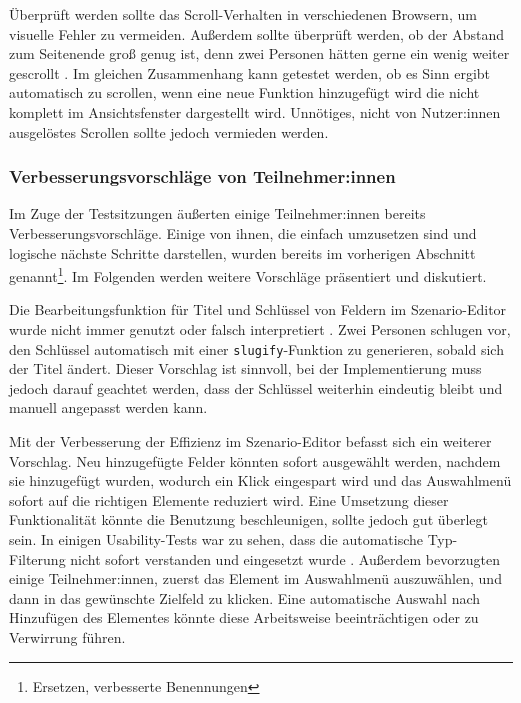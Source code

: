 Überprüft werden sollte das Scroll-Verhalten in verschiedenen Browsern, um visuelle Fehler zu vermeiden. Außerdem sollte überprüft werden, ob der Abstand zum Seitenende groß genug ist, denn zwei Personen hätten gerne ein wenig weiter gescrollt . Im gleichen Zusammenhang kann getestet werden, ob es Sinn ergibt automatisch zu scrollen, wenn eine neue Funktion hinzugefügt wird die nicht komplett im Ansichtsfenster dargestellt wird. Unnötiges, nicht von Nutzer:innen ausgelöstes Scrollen sollte jedoch vermieden werden.



\subsubsection{Verbesserungsvorschläge von Teilnehmer:innen}

Im Zuge der Testsitzungen äußerten einige Teilnehmer:innen bereits Verbesserungsvorschläge. Einige von ihnen, die einfach umzusetzen sind und logische nächste Schritte darstellen, wurden bereits im vorherigen Abschnitt genannt\footnote{Ersetzen, verbesserte Benennungen}. Im Folgenden werden weitere Vorschläge präsentiert und diskutiert.

Die Bearbeitungsfunktion für Titel und Schlüssel von Feldern im Szenario-Editor wurde nicht immer genutzt oder falsch interpretiert . Zwei Personen schlugen vor, den Schlüssel automatisch mit einer \texttt{slugify}-Funktion zu generieren, sobald sich der Titel ändert. Dieser Vorschlag ist sinnvoll, bei der Implementierung muss jedoch darauf geachtet werden, dass der Schlüssel weiterhin eindeutig bleibt und manuell angepasst werden kann.

Mit der Verbesserung der Effizienz im Szenario-Editor befasst sich ein weiterer Vorschlag. Neu hinzugefügte Felder könnten sofort ausgewählt werden, nachdem sie hinzugefügt wurden, wodurch ein Klick eingespart wird und das Auswahlmenü sofort auf die richtigen Elemente reduziert wird. Eine Umsetzung dieser Funktionalität könnte die Benutzung beschleunigen, sollte jedoch gut überlegt sein. In einigen Usability-Tests war zu sehen, dass die automatische Typ-Filterung nicht sofort verstanden und eingesetzt wurde . Außerdem bevorzugten einige Teilnehmer:innen, zuerst das Element im Auswahlmenü auszuwählen, und dann in das gewünschte Zielfeld zu klicken. Eine automatische Auswahl nach Hinzufügen des Elementes könnte diese Arbeitsweise beeinträchtigen oder zu Verwirrung führen.

